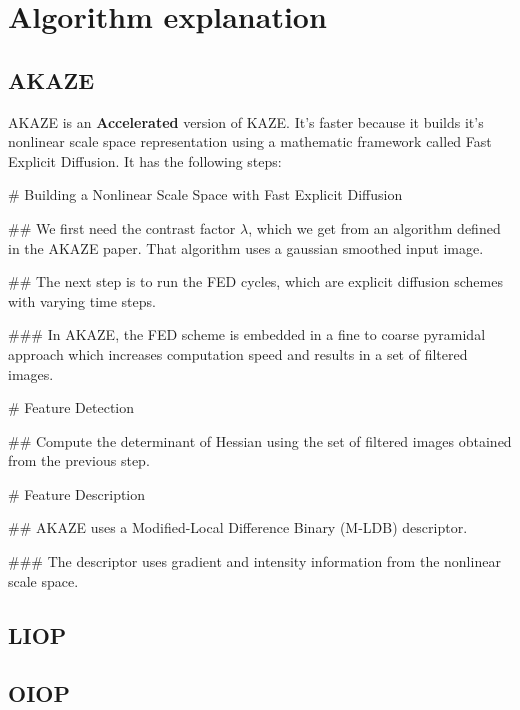 
\section{Algorithm explanation}

\subsection{AKAZE}

AKAZE is an \textbf{Accelerated} version of KAZE\@. It's faster because it builds
it's nonlinear scale space representation using a mathematic framework called
Fast Explicit Diffusion. It has the following steps:
\begin{easylist}[tractatus]

# Building a Nonlinear Scale Space with Fast Explicit Diffusion

## We first need the contrast factor \(\lambda\), which we get from an
algorithm defined in the AKAZE paper. That algorithm uses a gaussian smoothed
input image.

## The next step is to run the FED cycles, which are explicit diffusion schemes
with varying time steps.

### In AKAZE, the FED scheme is embedded in a fine to coarse pyramidal approach
which increases computation speed and results in a set of filtered images.

# Feature Detection

## Compute the determinant of Hessian using the set of filtered images obtained
from the previous step.

# Feature Description

## AKAZE uses a Modified-Local Difference Binary (M-LDB) descriptor. 

### The descriptor uses gradient and intensity information from the nonlinear
scale space.

\end{easylist}

\subsection{LIOP}

\begin{easylist}

\end{easylist}

\subsection{OIOP}


